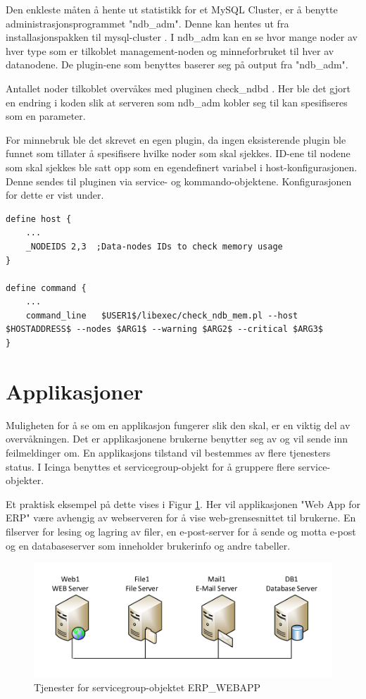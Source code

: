 Den enkleste måten å hente ut statistikk for et MySQL Cluster, er å benytte administrasjonsprogrammet "ndb\_adm". Denne kan hentes ut fra installasjonspakken til mysql-cluster \cite{ndbdownload}. I ndb\_adm kan en se hvor mange noder av hver type som er tilkoblet management-noden og minneforbruket til hver av datanodene. De plugin-ene som benyttes baserer seg på output fra "ndb\_adm".

Antallet noder tilkoblet overvåkes med pluginen check\_ndbd \cite{ndbnode}. Her ble det gjort en endring i koden slik at serveren som ndb\_adm kobler seg til kan spesifiseres som en parameter.

For minnebruk ble det skrevet en egen plugin, da ingen eksisterende plugin ble funnet som tillater å spesifisere hvilke noder som skal sjekkes. ID-ene til nodene som skal sjekkes ble satt opp som en egendefinert variabel i host-konfigurasjonen. Denne sendes til pluginen via service- og kommando-objektene. Konfigurasjonen for dette er vist under.

\begin{lstlisting}[style=example]
define host {
	...
	_NODEIDS 2,3  ;Data-nodes IDs to check memory usage
}

define command {
	...
	command_line   $USER1$/libexec/check_ndb_mem.pl --host $HOSTADDRESS$ --nodes $ARG1$ --warning $ARG2$ --critical $ARG3$
}
\end{lstlisting}
\section{Applikasjoner}
Muligheten for å se om en applikasjon fungerer slik den skal, er en viktig del av overvåkningen. Det er applikasjonene brukerne benytter seg av og vil sende inn feilmeldinger om. En applikasjons tilstand vil bestemmes av flere tjenesters status. I Icinga benyttes et servicegroup-objekt for å gruppere flere service-objekter.

Et praktisk eksempel på dette vises i Figur \ref{servicegroup_layout}. Her vil applikasjonen "Web App for ERP" være avhengig av webserveren for å vise web-grensesnittet til brukerne. En filserver for lesing og lagring av filer, en e-post-server for å sende og motta e-post og en databaseserver som inneholder brukerinfo og andre tabeller. 

\begin{figure}[H]
    \centering
    \includegraphics[scale=0.6]{img/servicegroup_layout}
    \caption{Tjenester for servicegroup-objektet ERP\_WEBAPP}
    \label{servicegroup_layout}
\end{figure}

